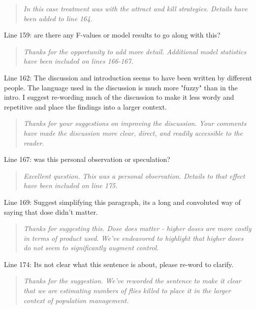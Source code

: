 \documentclass{article}
\begin{document}
\begin{quote}
    \textit{In this case treatment was with the attract and kill strategies.  Details have been added to line 164.  }
\end{quote}

Line 159: are there any F-values or model results to go along with this?

\begin{quote}
    \textit{Thanks for the opportunity to add more detail.  Additional model statistics have been included on lines 166-167.}
\end{quote}


Line 162: The discussion and introduction seems to have been written by different people. The language used in the discussion is much more "fuzzy" than in the intro. I suggest re-wording much of the discussion to make it less wordy and repetitive and place the findings into a larger context.


\begin{quote}
    \textit{Thanks for your suggestions on improving the discussion.  Your comments have made the discussion more clear, direct, and readily accessible to the reader.  
    }
\end{quote}

Line 167: was this personal observation or speculation?

\begin{quote}
    \textit{Excellent question.  This was a personal observation. Details to that effect have been included on line 175. 
    }
\end{quote}

Line 169: Suggest simplifying this paragraph, its a long and convoluted way of saying that dose didn't matter.

\begin{quote}
    \textit{Thanks for suggesting this.  Dose does matter - higher doses are more costly in terms of product used.  We've endeavored to highlight that higher doses do not seem to significantly augment control.  }
\end{quote}

Line 174: Its not clear what this sentence is about, please re-word to clarify.

\begin{quote}
    \textit{Thanks for the suggestion.  We've reworded the sentence to make it clear that we are estimating numbers of flies killed to place it in the larger context of population management.  }
\end{quote}
\end{document}
